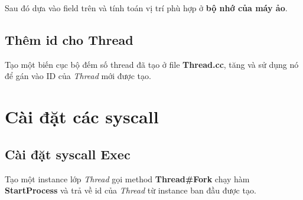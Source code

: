 Sau đó dựa vào field trên và tính toán vị trí phù hợp ở \textbf{bộ nhớ của máy ảo}.

\subsection{Thêm id cho Thread}
Tạo một biến cục bộ đếm số thread đã tạo ở file \textbf{Thread.cc}, tăng và sử dụng nó để gán vào ID của \textit{Thread} mới được tạo.

\section{Cài đặt các syscall}
\subsection{Cài đặt syscall Exec}
Tạo một instance lớp \textit{Thread} gọi method \textbf{Thread\#Fork} chạy hàm \textbf{StartProcess} và trả về id của \textit{Thread} từ instance ban đầu được tạo.
